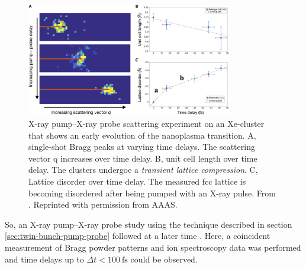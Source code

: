 \begin{figure}
	\centering
		\includegraphics[width=0.80\textwidth]{images/ken-science.jpg}
	\caption[Experiment that shows early evolution of the nanoplasma transition.]{X-ray pump--X-ray probe scattering experiment on an Xe-cluster that shows an early evolution of the nanoplasma transition. A, single-shot Bragg peaks at varying time delays. The scattering vector q increases over time delay. B, unit cell length over time delay. The clusters undergoe a \textit{transient lattice compression}. C, Lattice disorder over time delay. The measured fcc lattice is becoming disordered after being pumped with an X-ray pulse. From \citep{Ferguson-2016-SciAdv}. Reprinted with permission from AAAS.}
	\label{fig:ken-science}
\end{figure}
So, an X-ray pump--X-ray probe study using the technique described in section \ref{sec:twin-bunch-pump-probe} followed at a later time \citep{Ferguson-2016-SciAdv}. Here, a coincident measurement of Bragg powder patterns and ion spectroscopy data was performed and time delays up to $\Delta t<\SI{100}{\femto\second}$ could be observed.

